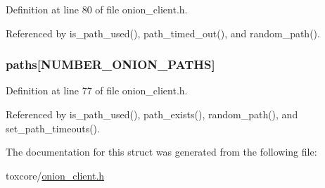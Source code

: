 Definition at line 80 of file onion\+\_\+client.\+h.



Referenced by is\+\_\+path\+\_\+used(), path\+\_\+timed\+\_\+out(), and random\+\_\+path().

\hypertarget{struct_onion___client___paths_afaa8c1f23d89bd5acee1f956e8872061}{
\subsubsection[{paths}]{ paths\mbox{[}{\bf N\+U\+M\+B\+E\+R\+\_\+\+O\+N\+I\+O\+N\+\_\+\+P\+A\+T\+H\+S}\mbox{]}}}\label{struct_onion___client___paths_afaa8c1f23d89bd5acee1f956e8872061}


Definition at line 77 of file onion\+\_\+client.\+h.



Referenced by is\+\_\+path\+\_\+used(), path\+\_\+exists(), random\+\_\+path(), and set\+\_\+path\+\_\+timeouts().



The documentation for this struct was generated from the following file\+:\begin{DoxyCompactItemize}
\item 
toxcore/\hyperlink{onion__client_8h}{onion\+\_\+client.\+h}\end{DoxyCompactItemize}

